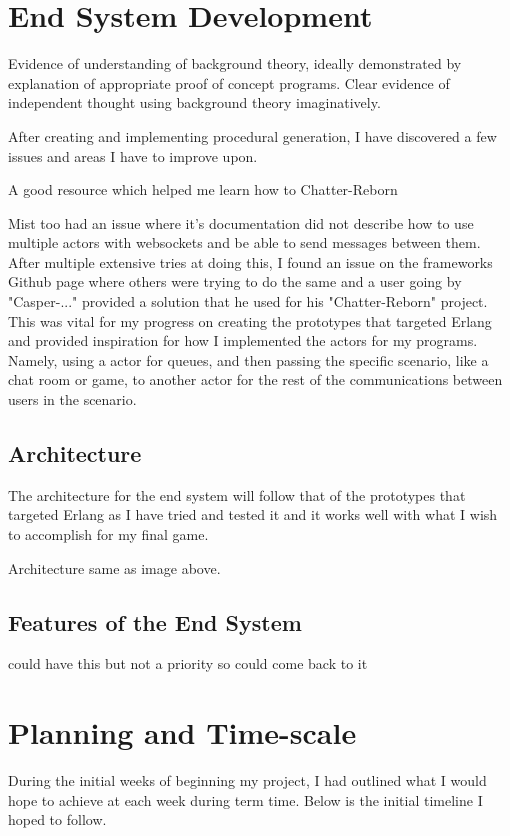 \documentclass[]{project_interim}
\begin{document}
\chapter{End System Development}

Evidence of understanding of background theory, ideally demonstrated by
explanation of appropriate proof of concept programs.
Clear evidence of independent thought using background theory imaginatively.

After creating and implementing procedural generation, I have discovered a few issues and areas I
have to improve upon.

A good resource which helped me learn how to
Chatter-Reborn


Mist too had an issue where it's documentation did not describe how to use multiple
actors with websockets and be able to send messages between them. After multiple
extensive tries at doing this, I found an issue on the frameworks Github page
where others were trying to do the same and a user going by "Casper-..." provided
a solution that he used for his "Chatter-Reborn" project. This was vital for my
progress on creating the prototypes that targeted Erlang and provided inspiration
for how I implemented the actors for my programs. Namely, using a actor for queues,
and then passing the specific scenario, like a chat room or game, to another actor
for the rest of the communications between users in the scenario.
\section{Architecture}
The architecture for the end system will follow that of the prototypes that
targeted Erlang as I have tried and tested it and it works well with what I
wish to accomplish for my final game.

Architecture same as image above.
\section{Features of the End System}

could have this but not a priority so could come back to it

\newpage
{}


\chapter{Planning and Time-scale}
During the initial weeks of beginning my project, I had outlined what I would hope to achieve at
each week during term time. Below is the initial timeline I hoped to follow.
\end{document}
